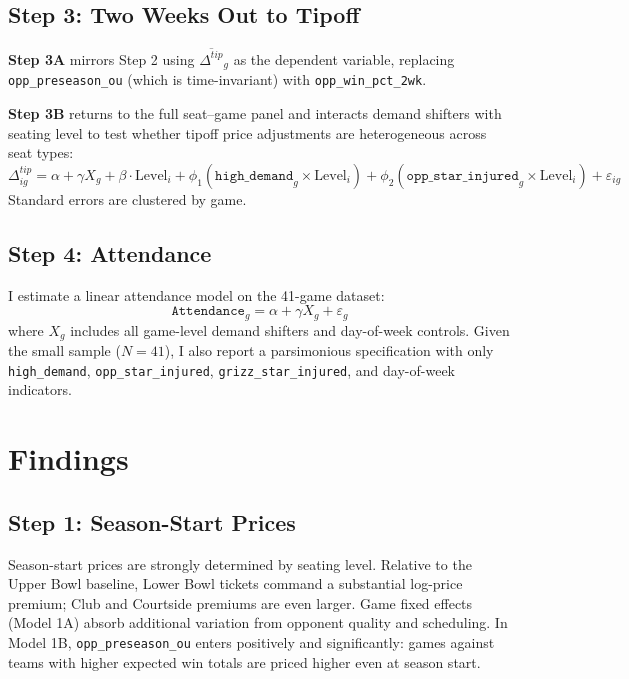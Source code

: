 \documentclass[12pt]{article}
\begin{document}
\subsection{Step 3: Two Weeks Out to Tipoff}
 
\textbf{Step 3A} mirrors Step 2 using $\overline{\Delta^{tip}}_g$ as the dependent variable, replacing \texttt{opp\_preseason\_ou} (which is time-invariant) with \texttt{opp\_win\_pct\_2wk}.
 
\textbf{Step 3B} returns to the full seat--game panel and interacts demand shifters with seating level to test whether tipoff price adjustments are heterogeneous across seat types:
\begin{equation}
    \Delta^{tip}_{ig} = \alpha + \gamma X_g + \beta \cdot \text{Level}_i
    + \phi_1 (\texttt{high\_demand}_g \times \text{Level}_i)
    + \phi_2 (\texttt{opp\_star\_injured}_g \times \text{Level}_i) + \varepsilon_{ig}
\end{equation}
Standard errors are clustered by game.
 
\subsection{Step 4: Attendance}
 
I estimate a linear attendance model on the 41-game dataset:
\begin{equation}
    \texttt{Attendance}_g = \alpha + \gamma X_g + \varepsilon_g
\end{equation}
where $X_g$ includes all game-level demand shifters and day-of-week controls. Given the small sample ($N = 41$), I also report a parsimonious specification with only \texttt{high\_demand}, \texttt{opp\_star\_injured}, \texttt{grizz\_star\_injured}, and day-of-week indicators.
 
 
\section{Findings}
\label{sec:findings}
 
\subsection{Step 1: Season-Start Prices}
 
Season-start prices are strongly determined by seating level. Relative to the Upper Bowl baseline, Lower Bowl tickets command a substantial log-price premium; Club and Courtside premiums are even larger. Game fixed effects (Model 1A) absorb additional variation from opponent quality and scheduling. In Model 1B, \texttt{opp\_preseason\_ou} enters positively and significantly: games against teams with higher expected win totals are priced higher even at season start.
\end{document}

